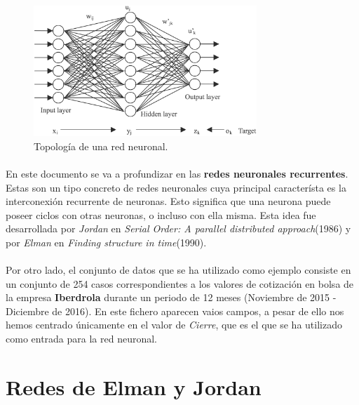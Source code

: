 \documentclass[10pt, a4paper,spanish]{article}
\begin{document}
		\begin{figure}[htpb!]
			\begin{center}
				\includegraphics[width=0.75\textwidth]{neural-network}
						\caption{Topología de una red neuronal.}
						\label{fig:neural-network}
				\end{center}
		\end{figure}

		\paragraph{}
		En este documento se va a profundizar en las \textbf{redes neuronales recurrentes}. Estas son un tipo concreto de redes neuronales cuya principal característa es la interconexión recurrente de neuronas. Esto significa que una neurona puede poseer ciclos con otras neuronas, o incluso con ella misma. Esta idea fue desarrollada por \emph{Jordan} en \emph{Serial Order: A parallel distributed approach}(1986)\cite{jordan:article} y por \emph{Elman} en \emph{Finding structure in time}(1990)\cite{elman:article}.

		\paragraph{}
		Por otro lado, el conjunto de datos que se ha utilizado como ejemplo consiste en un conjunto de 254 casos correspondientes a los valores de cotización en bolsa de la empresa \textbf{Iberdrola} durante un periodo de 12 meses (Noviembre de 2015 - Diciembre de 2016). En este fichero aparecen vaios campos, a pesar de ello nos hemos centrado únicamente en el valor de \emph{Cierre}, que es el que se ha utilizado como entrada para la red neuronal.


	\section{Redes de Elman y Jordan}
\end{document}
